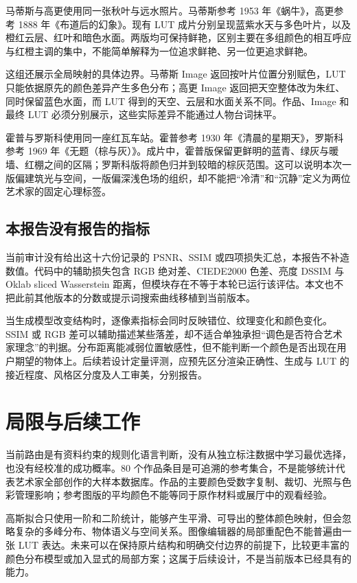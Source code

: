 马蒂斯与高更使用同一张秋叶与远水照片。马蒂斯参考 1953 年《蜗牛》\cite{matisse}，高更参考 1888 年《布道后的幻象》\cite{gauguin}。现有 LUT 成片分别呈现蓝紫水天与多色叶片，以及橙红云层、红叶和暗色水面。两版均可保持鲜艳，区别主要在多组颜色的相互呼应与红橙主调的集中，不能简单解释为一位追求鲜艳、另一位更追求鲜艳。

这组还展示全局映射的具体边界。马蒂斯 Image 返回按叶片位置分别赋色，LUT 只能依据原先的颜色差异产生多色分布；高更 Image 返回把天空整体改为朱红、同时保留蓝色水面，而 LUT 得到的天空、云层和水面关系不同。作品、Image 和最终 LUT 必须分别展示，这些实际差异不能通过人物台词抹平。

霍普与罗斯科使用同一座红瓦车站。霍普参考 1930 年《清晨的星期天》\cite{hopper}，罗斯科参考 1969 年《无题（棕与灰）》\cite{rothko}。成片中，霍普版保留更鲜明的蓝青、绿灰与暖墙、红棚之间的区隔；罗斯科版将颜色归并到较暗的棕灰范围。这可以说明本次一版偏建筑光与空间，一版偏深浅色场的组织，却不能把“冷清”和“沉静”定义为两位艺术家的固定心理标签。

\subsection{本报告没有报告的指标}
当前审计没有给出这十六份记录的 PSNR、SSIM 或四项损失汇总，本报告不补造数值。代码中的辅助损失包含 RGB 绝对差、CIEDE2000 色差、亮度 DSSIM 与 Oklab sliced Wasserstein 距离，但模块存在不等于本轮已运行该评估。本文也不把此前其他版本的分数或提示词搜索曲线移植到当前版本。

当生成模型改变结构时，逐像素指标会同时反映错位、纹理变化和颜色变化。SSIM 或 RGB 差可以辅助描述某些落差，却不适合单独承担“调色是否符合艺术家理念”的判据。分布距离能减弱位置敏感性，但不能判断一个颜色是否出现在用户期望的物体上。后续若设计定量评测，应预先区分渲染正确性、生成与 LUT 的接近程度、风格区分度及人工审美，分别报告。

\section{局限与后续工作}
当前路由是有资料约束的规则化语言判断，没有从独立标注数据中学习最优选择，也没有经校准的成功概率。80 个作品条目是可追溯的参考集合，不是能够统计代表艺术家全部创作的大样本数据库。作品的主要颜色受数字复制、裁切、光照与色彩管理影响；参考图版的平均颜色不能等同于原作材料或展厅中的观看经验。

高斯拟合只使用一阶和二阶统计，能够产生平滑、可导出的整体颜色映射，但会忽略复杂的多峰分布、物体语义与空间关系。图像编辑器的局部重配色不能普遍由一张 LUT 表达。未来可以在保持原片结构和明确交付边界的前提下，比较更丰富的颜色分布模型或加入显式的局部方案；这属于后续设计，不是当前版本已经具有的能力。

